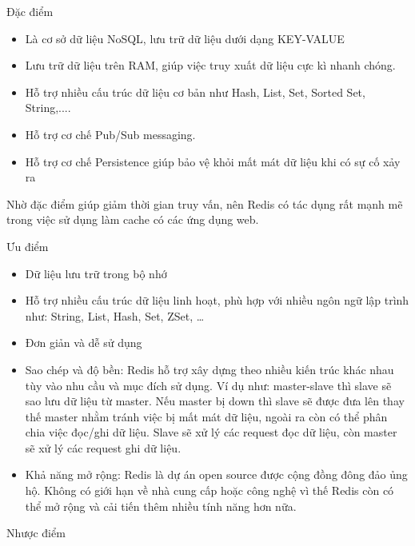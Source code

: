 \begin{itemize}
            Đặc điểm
            
            \begin{itemize}
                \item Là cơ sở dữ liệu NoSQL, lưu trữ dữ liệu dưới dạng KEY-VALUE
                \item Lưu trữ dữ liệu trên RAM, giúp việc truy xuất dữ liệu cực kì nhanh chóng.
                \item Hỗ trợ nhiều cấu trúc dữ liệu cơ bản như Hash, List, Set, Sorted Set, String,....
                \item Hỗ trợ cơ chế Pub/Sub messaging.
                \item Hỗ trợ cơ chế Persistence giúp bảo vệ khỏi mất mát dữ liệu khi có sự cố xảy ra
            \end{itemize}
            
            Nhờ đặc điểm giúp giảm thời gian truy vấn, nên Redis có tác dụng rất mạnh mẽ trong việc sử dụng làm cache có các ứng dụng web.
            
            Ưu điểm
            
            \begin{itemize}
                \item Dữ liệu lưu trữ trong bộ nhớ
                \item Hỗ trợ nhiều cấu trúc dữ liệu linh hoạt, phù hợp với nhiều ngôn ngữ lập trình như: String, List, Hash, Set, ZSet, …
                \item Đơn giản và dễ sử dụng
                \item Sao chép và độ bền: Redis hỗ trợ xây dựng theo nhiều kiến trúc khác nhau tùy vào nhu cầu và mục đích sử dụng. Ví dụ như: master-slave thì slave sẽ sao lưu dữ liệu từ master. Nếu master bị down thì slave sẽ được đưa lên thay thế master nhằm tránh việc bị mất mát dữ liệu, ngoài ra còn có thể phân chia việc đọc/ghi dữ liệu. Slave sẽ xử lý các request đọc dữ liệu, còn master sẽ xử lý các request ghi dữ liệu.
                \item Khả năng mở rộng: Redis là dự án open source được cộng đồng đông đảo ủng hộ. Không có giới hạn về nhà cung cấp hoặc công nghệ vì thế Redis còn có thể mở rộng và cải tiến thêm nhiều tính năng hơn nữa.
            \end{itemize}
            
            Nhược điểm
            

\end{itemize}
